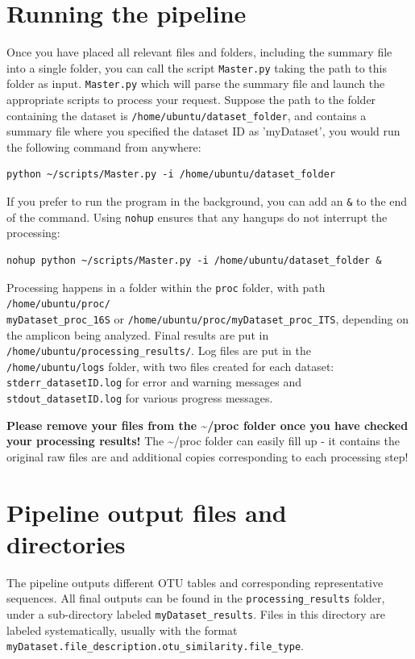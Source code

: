 \documentclass[11pt, oneside]{article}   	%
\begin{document}
\section{Running the pipeline}
Once you have placed all relevant files and folders, including the summary file into a single folder, you can call the script {\tt Master.py} taking the path to this folder as input.  {\tt Master.py} which will parse the summary file and launch the appropriate scripts to process your request.  Suppose the path to the folder containing the dataset is {\tt /home/ubuntu/dataset\_folder}, and contains a summary file where you specified the dataset ID as 'myDataset', you would run the following command from anywhere:
\begin{verbatim}
python ~/scripts/Master.py -i /home/ubuntu/dataset_folder
\end{verbatim}
If you prefer to run the program in the background, you can add an {\tt \&} to the end of the command. Using {\tt nohup} ensures that any hangups do not interrupt the processing:
\begin{verbatim}
nohup python ~/scripts/Master.py -i /home/ubuntu/dataset_folder &
\end{verbatim}
Processing happens in a folder within the {\tt proc} folder, with path {\tt /home/ubuntu/proc/ \\ myDataset\_proc\_16S} or {\tt /home/ubuntu/proc/myDataset\_proc\_ITS}, depending on the amplicon being analyzed.  Final results are put in {\tt /home/ubuntu/processing\_results/}. Log files are put in the {\tt /home/ubuntu/logs} folder, with two files created for each dataset: {\tt stderr\_datasetID.log} for error and warning messages and {\tt stdout\_datasetID.log} for various progress messages.

\textbf{Please remove your files from the \~{}/proc folder once you have checked your processing results!} The \~{}/proc folder can easily fill up - it contains the original raw files are and additional copies corresponding to each processing step!

\section{Pipeline output files and directories}
The pipeline outputs different OTU tables and corresponding representative sequences. All final outputs can be found in the {\tt processing\_results} folder, under a sub-directory labeled {\tt myDataset\_results}. Files in this directory are labeled systematically, usually with the format {\tt myDataset.file\_description.otu\_similarity.file\_type}. 
\end{document}
